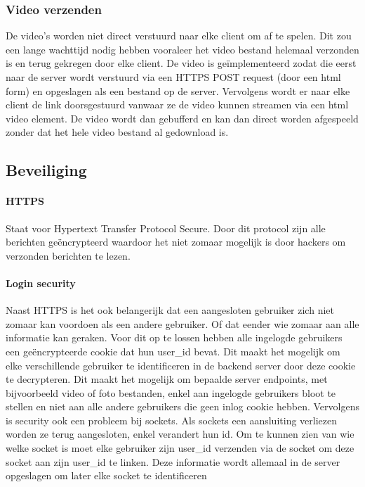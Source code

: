 \subsubsection{Video verzenden}
De video's worden niet direct verstuurd naar elke client om af te spelen. Dit zou een lange wachttijd nodig hebben vooraleer het video bestand helemaal verzonden is en terug gekregen door elke client.
De video is geïmplementeerd zodat die eerst naar de server wordt verstuurd via een HTTPS POST request (door een html form) en opgeslagen als een bestand op de server. Vervolgens wordt er naar elke client de link doorsgestuurd vanwaar ze de video kunnen streamen via een html video element. De video wordt dan gebufferd en kan dan direct worden afgespeeld zonder dat het hele video bestand al gedownload is.

\subsection{Beveiliging}
\paragraph{HTTPS} Staat voor Hypertext Transfer Protocol Secure. Door dit protocol zijn alle berichten geëncrypteerd waardoor het niet zomaar mogelijk is door hackers om verzonden berichten te lezen.
\paragraph{Login security} Naast HTTPS is het ook belangerijk dat een aangesloten gebruiker zich niet zomaar kan voordoen als een andere gebruiker. Of dat eender wie zomaar aan alle informatie kan geraken. Voor dit op te lossen hebben alle ingelogde gebruikers een geëncrypteerde cookie dat hun user\_id bevat. Dit maakt het mogelijk om elke verschillende gebruiker te identificeren in de backend server door deze cookie te decrypteren. Dit maakt het mogelijk om bepaalde server endpoints, met bijvoorbeeld video of foto bestanden, enkel aan ingelogde gebruikers bloot te stellen en niet aan alle andere gebruikers die geen inlog cookie hebben.
Vervolgens is security ook een probleem bij sockets. Als sockets een aansluiting verliezen worden ze terug aangesloten, enkel verandert hun id. Om te kunnen zien van wie welke socket is moet elke gebruiker zijn user\_id verzenden via de socket om deze socket aan zijn user\_id te linken. Deze informatie wordt allemaal in de server opgeslagen om later elke socket te identificeren

